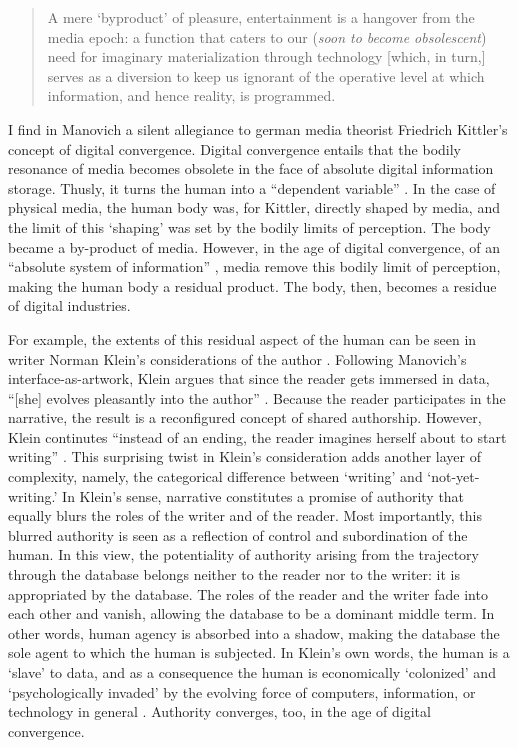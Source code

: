 \begin{quote}
	A mere `byproduct' of pleasure, entertainment is a hangover from the media epoch: a function that caters to our (\textit{soon to become obsolescent}) need for imaginary materialization through technology [which, in turn,] serves as a diversion to keep us ignorant of the operative level at which information, and hence reality, is programmed. \im \parencite[59]{Han02:Cin}
\end{quote}

I find in Manovich a silent allegiance to german media theorist Friedrich Kittler's concept of digital convergence. Digital convergence entails that the bodily resonance of media becomes obsolete in the face of absolute digital information storage. Thusly, it turns the human into a ``dependent variable'' \parencite[59]{Han02:Cin}. In the case of physical media, the human body was, for Kittler, directly shaped by media, and the limit of this `shaping' was set by the bodily limits of perception. The body became a by-product of media. However, in the age of digital convergence, of an ``absolute system of information'' \parencite[63]{Han02:Cin}, media remove this bodily limit of perception, making the human body a residual product. The body, then, becomes a residue of digital industries.

For example, the extents of this residual aspect of the human can be seen in writer Norman Klein's considerations of the author \parencite{Kle07:Wai}. Following Manovich's interface-as-artwork, Klein argues that since the reader gets immersed in data, ``[she] evolves pleasantly into the author'' \parencite[93]{Kle07:Wai}. Because the reader participates in the narrative, the result is a reconfigured concept of shared authorship. However, Klein continutes ``instead of an ending, the reader imagines herself about to start writing'' \parencite[93]{Kle07:Wai}. This surprising twist in Klein's consideration adds another layer of complexity, namely, the categorical difference between `writing' and `not-yet-writing.' In Klein's sense, narrative constitutes a promise of authority that equally blurs the roles of the writer and of the reader. Most importantly, this blurred authority is seen as a reflection of control and subordination of the human. In this view, the potentiality of authority arising from the trajectory through the database belongs neither to the reader nor to the writer: it is appropriated by the database. The roles of the reader and the writer fade into each other and vanish, allowing the database to be a dominant middle term. In other words, human agency is absorbed into a shadow, making the database the sole agent to which the human is subjected. In Klein's own words, the human is a `slave' to data, and as a consequence the human is economically `colonized' and `psychologically invaded' by the evolving force of computers, information, or technology in general \parencite[86-8]{Kle07:Wai}. Authority converges, too, in the age of digital convergence.

